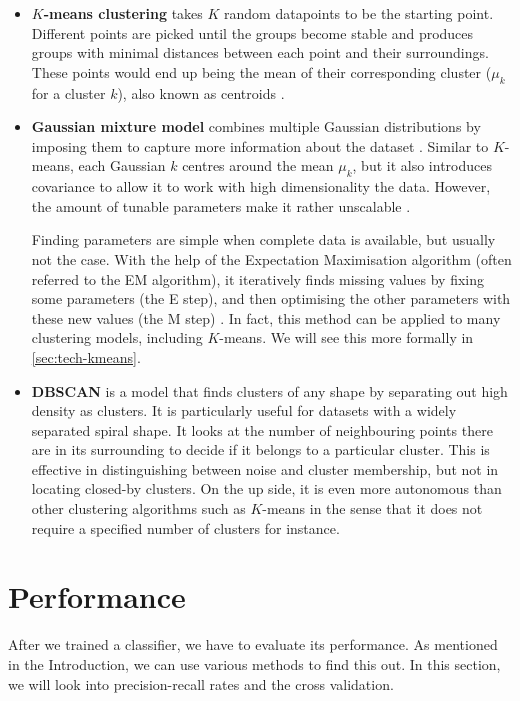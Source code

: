 \begin{itemize}

  \item \textbf{$K$-means clustering} takes $K$ random datapoints to be the starting point. Different points are picked until the groups become stable and produces groups with minimal distances between each point and their surroundings. These points would end up being the mean of their corresponding cluster ($\mu_k$ for a cluster $k$), also known as centroids \cite{bishop-book}.

  \item \textbf{Gaussian mixture model} combines multiple Gaussian distributions by imposing them to capture more information about the dataset \cite{bishop-book}. Similar to $K$-means, each Gaussian $k$ centres around the mean $\mu_k$, but it also introduces covariance to allow it to work with high dimensionality the data. However, the amount of tunable parameters make it rather unscalable \cite{scikit-docs}.

Finding parameters are simple when complete data is available, but usually not the case. With the help of the Expectation Maximisation algorithm (often referred to the EM algorithm), it iteratively finds missing values by fixing some parameters (the E step), and then optimising the other parameters with these new values (the M step) \cite{mur-book}. In fact, this method can be applied to many clustering models, including $K$-means. We will see this more formally in \autoref{sec:tech-kmeans}.

  \item \textbf{DBSCAN} is a model that finds clusters of any shape by separating out high density as clusters. It is particularly useful for datasets with a widely separated spiral shape. It looks at the number of neighbouring points there are in its surrounding to decide if it belongs to a particular cluster. This is effective in distinguishing between noise and cluster membership, but not in locating closed-by clusters. On the up side, it is even more autonomous than other clustering algorithms such as $K$-means in the sense that it does not require a specified number of clusters for instance.
\end{itemize}


\section{Performance}
After we trained a classifier, we have to evaluate its performance. As mentioned in the Introduction, we can use various methods to find this out. In this section, we will look into precision-recall rates and the cross validation.

